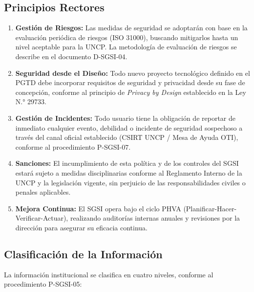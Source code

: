 \documentclass[10pt,letterpaper]{article}
\begin{document}
\subsection{Principios Rectores}\label{principios-rectores}

\begin{enumerate}
\def\labelenumi{\arabic{enumi}.}
\item
  \textbf{Gestión de Riesgos:} Las medidas de seguridad se adoptarán con
  base en la evaluación periódica de riesgos (ISO 31000), buscando
  mitigarlos hasta un nivel aceptable para la UNCP. La metodología de
  evaluación de riesgos se describe en el documento D-SGSI-04.
\item
  \textbf{Seguridad desde el Diseño:} Todo nuevo proyecto tecnológico
  definido en el PGTD debe incorporar requisitos de seguridad y
  privacidad desde su fase de concepción, conforme al principio de
  \emph{Privacy by Design} establecido en la Ley N.° 29733.
\item
  \textbf{Gestión de Incidentes:} Todo usuario tiene la obligación de
  reportar de inmediato cualquier evento, debilidad o incidente de
  seguridad sospechoso a través del canal oficial establecido (CSIRT
  UNCP / Mesa de Ayuda OTI), conforme al procedimiento P-SGSI-07.
\item
  \textbf{Sanciones:} El incumplimiento de esta política y de los
  controles del SGSI estará sujeto a medidas disciplinarias conforme al
  Reglamento Interno de la UNCP y la legislación vigente, sin perjuicio
  de las responsabilidades civiles o penales aplicables.
\item
  \textbf{Mejora Continua:} El SGSI opera bajo el ciclo PHVA
  (Planificar-Hacer-Verificar-Actuar), realizando auditorías internas
  anuales y revisiones por la dirección para asegurar su eficacia
  continua.
\end{enumerate}

\subsection{Clasificación de la
Información}\label{clasificaciuxf3n-de-la-informaciuxf3n}

La información institucional se clasifica en cuatro niveles, conforme al
procedimiento P-SGSI-05:
\end{document}
